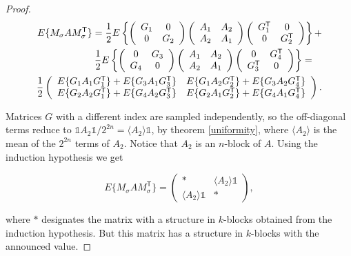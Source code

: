 \documentclass[12pt]{article}
\begin{document}
\begin{proof}
  \begin{align}
    E\{M_\sigma A M_\sigma^\mathsf{T}\} =
    \frac{1}{2} E \left\{
    \left( \begin{array}{cc}
      G_1 & 0 \\
      0   & G_2
    \end{array} \right)
    \left( \begin{array}{cc}
      A_1 & A_2 \\
      A_2 & A_1
    \end{array} \right)
    \left( \begin{array}{cc}
      G_1^\mathsf{T} & 0 \\
      0  & G_2^\mathsf{T}
    \end{array} \right) \right\} + \notag \\
    \frac{1}{2} E \left\{
    \left( \begin{array}{cc}
      0 & G_3\\
      G_4 & 0
    \end{array} \right)
    \left( \begin{array}{cc}
      A_1 & A_2 \\
      A_2 & A_1
    \end{array} \right)
    \left( \begin{array}{cc}
      0 & G_4^\mathsf{T} \\
      G_3^\mathsf{T} & 0
    \end{array} \right) \right\} = \quad \\
    \frac{1}{2} \left( \begin{array}{cc}
      E\{G_1 A_1 G_1^\mathsf{T}\} + E\{G_3 A_1 G_3^\mathsf{T}\}
        & E\{G_1 A_2 G_2^\mathsf{T}\} + E\{G_3 A_2 G_4^\mathsf{T}\}\\
      E\{G_2 A_2 G_1^\mathsf{T}\} + E\{G_4 A_2 G_3^\mathsf{T}\}
        & E\{G_2 A_1 G_2^\mathsf{T}\} + E\{G_4 A_1 G_4^\mathsf{T}\}
    \end{array} \right). \notag
  \end{align}

  Matrices $G$ with a different index are sampled independently,
  so the off-diagonal terms reduce to
  $\mathbb{1}A_2\mathbb{1}/2^{2n} = \langle A_2\rangle\mathbb{1}$,
  by theorem \ref{uniformity}, where $\langle A_2 \rangle$ is the
  mean of the $2^{2n}$ terms of $A_2$. Notice that $A_2$ is an
  $n$-block of $A$. Using the induction hypothesis we get

  \begin{equation*}
    E\{M_\sigma A M_\sigma^\mathsf{T}\} =
    \left( \begin{array}{cc}
      * & \langle A_2\rangle\mathbb{1} \\
      \langle A_2\rangle\mathbb{1} & *
    \end{array} \right),
  \end{equation*}

  \noindent
  where $*$ designates the matrix with a structure in $k$-blocks
  obtained from the induction hypothesis. But this matrix has a
  structure in $k$-blocks with the announced value.

  \end{proof}
\end{document}
